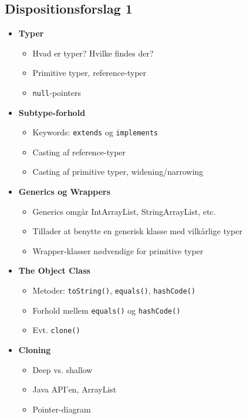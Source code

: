 \subsection{Dispositionsforslag 1}

\begin{itemize}
    \item \textbf{Typer}
    \begin{itemize}
        \item Hvad er typer? Hvilke findes der?
        \item Primitive typer, reference-typer
        \item \verb|null|-pointers
    \end{itemize}
    
    \item \textbf{Subtype-forhold}
    \begin{itemize}
        \item Keywords: \verb|extends| og \verb|implements|
        \item Casting af reference-typer
        \item Casting af primitive typer, widening/narrowing
    \end{itemize}
    
    \item \textbf{Generics og Wrappers}
    \begin{itemize}
        \item Generics omgår IntArrayList, StringArrayList, etc.
        \item Tillader at benytte en generisk klasse med vilkårlige typer
        \item Wrapper-klasser nødvendige for primitive typer
    \end{itemize}
    
    \item \textbf{The Object Class}
    \begin{itemize}
        \item Metoder: \verb|toString()|, \verb|equals()|, \verb|hashCode()|
        \item Forhold mellem \verb|equals()| og \verb|hashCode()|
        \item Evt. \verb|clone()|
    \end{itemize}
    
    \item \textbf{Cloning}
    \begin{itemize}
        \item Deep vs. shallow
        \item Java API'en, ArrayList
        \item Pointer-diagram
    \end{itemize}
    
\end{itemize}
